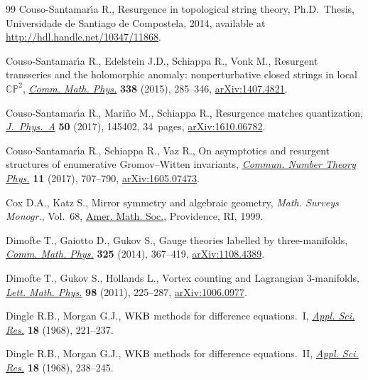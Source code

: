 \documentclass[pdftex]{sigma}
\numberwithin{equation}{section}
\begin{document}
\begin{thebibliography}{99}
Couso-Santamar\'{\i}a R., Resurgence in topological string theory, Ph.D.~Thesis, {U}niversidade de Santiago de Compostela, 2014, available at
 \url{http://hdl.handle.net/10347/11868}.

Couso-Santamar\'{\i}a R., Edelstein J.D., Schiappa R., Vonk M., Resurgent
 transseries and the holomorphic anomaly: nonperturbative closed strings in
 local {${\mathbb{CP}}^2$}, \href{https://doi.org/10.1007/s00220-015-2358-0}{\textit{Comm. Math. Phys.}} \textbf{338} (2015),
 285--346, \href{https://arxiv.org/abs/1407.4821}{arXiv:1407.4821}.

Couso-Santamar\'{\i}a R., Mari\~no M., Schiappa R., Resurgence matches
 quantization, \href{https://doi.org/10.1088/1751-8121/aa5e01}{\textit{J.~Phys.~A}} \textbf{50} (2017), 145402, 34~pages,
 \href{https://arxiv.org/abs/1610.06782}{arXiv:1610.06782}.

Couso-Santamar\'{\i}a R., Schiappa R., Vaz R., On asymptotics and resurgent
 structures of enumerative {G}romov--{W}itten invariants, \href{https://doi.org/10.4310/CNTP.2017.v11.n4.a1}{\textit{Commun.
 Number Theory Phys.}} \textbf{11} (2017), 707--790, \href{https://arxiv.org/abs/1605.07473}{arXiv:1605.07473}.

Cox D.A., Katz S., Mirror symmetry and algebraic geometry, \textit{Math.
 Surveys Monogr.}, Vol.~68, \href{https://doi.org/10.1090/surv/068}{Amer. Math. Soc.}, Providence, RI, 1999.

Dimofte T., Gaiotto D., Gukov S., Gauge theories labelled by three-manifolds,
 \href{https://doi.org/10.1007/s00220-013-1863-2}{\textit{Comm. Math. Phys.}} \textbf{325} (2014), 367--419, \href{https://arxiv.org/abs/1108.4389}{arXiv:1108.4389}.

Dimofte T., Gukov S., Hollands L., Vortex counting and {L}agrangian
 3-manifolds, \href{https://doi.org/10.1007/s11005-011-0531-8}{\textit{Lett. Math. Phys.}} \textbf{98} (2011), 225--287,
 \href{https://arxiv.org/abs/1006.0977}{arXiv:1006.0977}.

Dingle R.B., Morgan G.J., {${\rm WKB}$} methods for difference equations.~{I},
 \href{https://doi.org/10.1007/BF00382348}{\textit{Appl. Sci. Res.}} \textbf{18} (1968), 221--237.

Dingle R.B., Morgan G.J., {${\rm WKB}$} methods for difference equations.~{II},
 \href{https://doi.org/10.1007/BF00382349}{\textit{Appl. Sci. Res.}} \textbf{18} (1968), 238--245.


\end{thebibliography}
\end{document}
